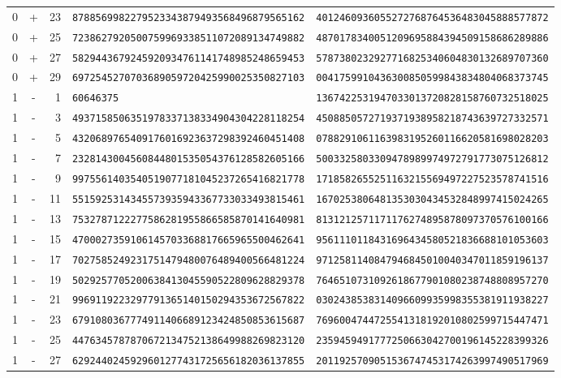 \begin{longtable}{@{}rcrll@{}}
0&+&23&\texttt{8788569982279523343879493568496879565162}&\texttt{4012460936055272768764536483045888577872}\\
0&+&25&\texttt{7238627920500759969338511072089134749882}&\texttt{4870178340051209695884394509158686289886}\\
0&+&27&\texttt{5829443679245920934761141748985248659453}&\texttt{5787380232927716825340604830132689707360}\\
0&+&29&\texttt{6972545270703689059720425990025350827103}&\texttt{0041759910436300850599843834804068373745}\\
1&-&1&\texttt{60646375}&\texttt{1367422531947033013720828158760732518025}\\
1&-&3&\texttt{4937158506351978337138334904304228118254}&\texttt{4508850572719371938958218743639727332571}\\
1&-&5&\texttt{4320689765409176016923637298392460451408}&\texttt{0788291061163983195260116620581698028203}\\
1&-&7&\texttt{2328143004560844801535054376128582605166}&\texttt{5003325803309478989974972791773075126812}\\
1&-&9&\texttt{9975561403540519077181045237265416821778}&\texttt{1718582655251163215569497227523578741516}\\
1&-&11&\texttt{5515925314345573935943367733033493815461}&\texttt{1670253806481353030434532848997415024265}\\
1&-&13&\texttt{7532787122277586281955866585870141640981}&\texttt{8131212571171176274895878097370576100166}\\
1&-&15&\texttt{4700027359106145703368817665965500462641}&\texttt{9561110118431696434580521836688101053603}\\
1&-&17&\texttt{7027585249231751479480076489400566481224}&\texttt{9712581140847946845010040347011859196137}\\
1&-&19&\texttt{5029257705200638413045590522809628829378}&\texttt{7646510731092618677901080238748808957270}\\
1&-&21&\texttt{9969119223297791365140150294353672567822}&\texttt{0302438538314096609935998355381911938227}\\
1&-&23&\texttt{6791080367774911406689123424850853615687}&\texttt{7696004744725541318192010802599715447471}\\
1&-&25&\texttt{4476345787870672134752138649988269823120}&\texttt{2359459491777250663042700196145228399326}\\
1&-&27&\texttt{6292440245929601277431725656182036137855}&\texttt{2011925709051536747453174263997490517969}\\

\end{longtable}
